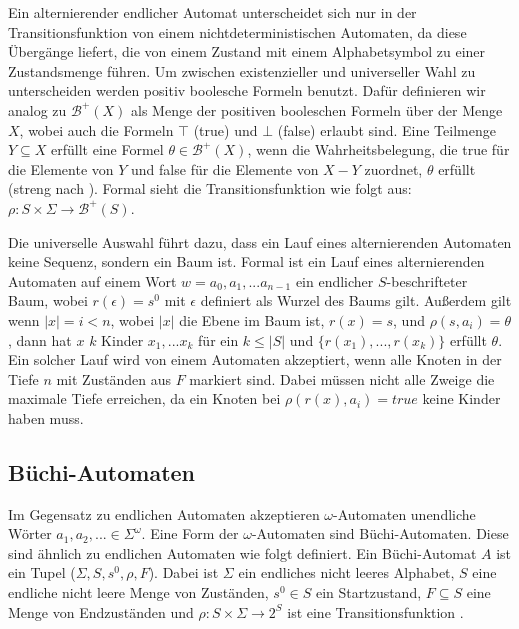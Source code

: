 Ein alternierender endlicher Automat unterscheidet sich nur in der Transitionsfunktion von einem nichtdeterministischen Automaten, da diese Übergänge liefert, die von einem Zustand mit einem Alphabetsymbol zu einer Zustandsmenge führen. Um zwischen existenzieller und universeller Wahl zu unterscheiden werden positiv boolesche Formeln benutzt. Dafür definieren wir analog zu \cite{vardi+96} $\mathcal{B}^+(X)$ als Menge der positiven booleschen Formeln über der Menge $X$, wobei auch die Formeln $\top$ (true) und $\bot$ (false) erlaubt sind. Eine Teilmenge $Y \subseteq X$ erfüllt eine Formel $\theta \in \mathcal{B}^+(X)$, wenn die Wahrheitsbelegung, die true für die Elemente von $Y$ und false für die Elemente von $X-Y$ zuordnet, $\theta$ erfüllt (streng nach \cite{vardi+96}). Formal sieht die Transitionsfunktion wie folgt aus: $\rho: S \times \Sigma \rightarrow \mathcal{B}^+(S)$. 

Die universelle Auswahl führt dazu, dass ein Lauf eines alternierenden Automaten keine Sequenz, sondern ein Baum ist. Formal ist ein Lauf eines alternierenden Automaten auf einem Wort $w=a_0,a_1,...a_{n-1}$ ein endlicher $S$-beschrifteter Baum, wobei $r(\epsilon)=s^0$ mit $\epsilon$ definiert als Wurzel des Baums gilt. Außerdem gilt wenn $|x|=i<n$, wobei $|x|$ die Ebene im Baum ist, $r(x)=s$, und $\rho(s,a_i)=\theta$, dann hat $x$ $k$ Kinder $x_1,...x_k$ für ein $k\leq|S|$ und $\{r(x_1),...,r(x_k)\}$ erfüllt $\theta$. Ein solcher Lauf wird von einem Automaten akzeptiert, wenn alle Knoten in der Tiefe $n$ mit Zuständen aus $F$ markiert sind. Dabei müssen nicht alle Zweige die maximale Tiefe erreichen, da ein Knoten bei $\rho(r(x),a_i)=true$ keine Kinder haben muss.

\subsection{Büchi-Automaten}
Im Gegensatz zu endlichen Automaten akzeptieren $\omega$-Automaten unendliche Wörter \linebreak $a_1,a_2,...\in\Sigma^{\omega}$. Eine Form der $\omega$-Automaten sind Büchi-Automaten. Diese sind ähnlich zu endlichen Automaten wie folgt definiert. Ein Büchi-Automat $A$ ist ein Tupel ($\Sigma, S, s^0, \rho, F$). Dabei ist $\Sigma$ ein endliches nicht leeres Alphabet, $S$ eine endliche nicht leere Menge von Zuständen, $s^0\in S$ ein Startzustand, $F\subseteq S$ eine Menge von Endzuständen und $\rho : S \times \Sigma \rightarrow 2^S$ ist eine Transitionsfunktion \cite{hofmann11,vardi+96}.

